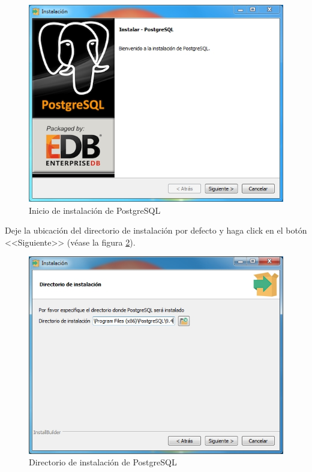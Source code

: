\vfill
\begin{figure}[H]
  \centering
  \includegraphics[width=.6\linewidth]{./img/postgres1.jpg}
\caption[]{Inicio de instalaci\'{o}n de PostgreSQL\label{fig:postgres1}}
\end{figure}
\vfill
Deje la ubicaci\'{o}n del directorio de instalaci\'{o}n por defecto y haga click en el bot\'{o}n <<Siguiente>> (v\'{e}ase la figura \ref{fig:postgres2}).
\vfill
\begin{figure}[H]
  \centering
  \includegraphics[width=.6\linewidth]{./img/postgres2.jpg}
\caption[]{Directorio de instalaci\'{o}n de PostgreSQL\label{fig:postgres2}}
\end{figure}
\vfill
\newpage

